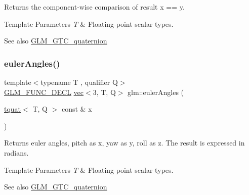 Returns the component-\/wise comparison of result x == y.


\begin{DoxyTemplParams}{Template Parameters}
{\em T} & Floating-\/point scalar types.\\
\hline
\end{DoxyTemplParams}
\begin{DoxySeeAlso}{See also}
\hyperlink{group__gtc__quaternion}{G\+L\+M\+\_\+\+G\+T\+C\+\_\+quaternion} 
\end{DoxySeeAlso}
\mbox{\label{group__gtc__quaternion_gaf21424fa62e03de8b11c2b776c17d7a3}} 
\subsubsection{\texorpdfstring{euler\+Angles()}{eulerAngles()}}
{\footnotesize\ttfamily template$<$typename T , qualifier Q$>$ \\
\hyperlink{setup_8hpp_ab2d052de21a70539923e9bcbf6e83a51}{G\+L\+M\+\_\+\+F\+U\+N\+C\+\_\+\+D\+E\+CL} \hyperlink{structglm_1_1vec}{vec}$<$3, T, Q$>$ glm\+::euler\+Angles (\begin{DoxyParamCaption}\item[{\hyperlink{structglm_1_1tquat}{tquat}$<$ T, Q $>$ const \&}]{x }\end{DoxyParamCaption})}

Returns euler angles, pitch as x, yaw as y, roll as z. The result is expressed in radians.


\begin{DoxyTemplParams}{Template Parameters}
{\em T} & Floating-\/point scalar types.\\
\hline
\end{DoxyTemplParams}
\begin{DoxySeeAlso}{See also}
\hyperlink{group__gtc__quaternion}{G\+L\+M\+\_\+\+G\+T\+C\+\_\+quaternion} 
\end{DoxySeeAlso}
\mbox{\label{group__gtc__quaternion_ga3f2720e2d77ec39186415f85ecd9cad0}} 
